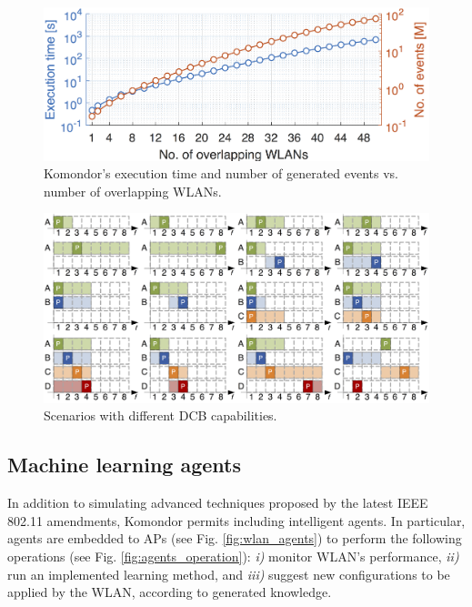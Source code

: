 \documentclass[conference]{IEEEtran}
\begin{document}
	\begin{figure}[t]
		\centering	
		\includegraphics[width=1\columnwidth]{results_scenario_3_perf.png}
		\caption{Komondor's execution time and number of generated events vs. number of overlapping WLANs.}
		\label{fig:results_high_density_scenarios_time}
	\end{figure}
	
	\begin{figure}[h]
		\centering	
		\includegraphics[width=0.95\columnwidth]{channel_allocation.png}
		\caption{Scenarios with different DCB capabilities.} %
		\label{fig:channel_allocation}
	\end{figure}
	
	\subsection{Machine learning agents}
	\label{section:machine_learning}
	
	In addition to simulating advanced techniques proposed by the latest IEEE 802.11 amendments, Komondor permits including intelligent agents. In particular, agents are embedded to APs (see Fig. \ref{fig:wlan_agents}) to perform the following operations (see Fig. \ref{fig:agents_operation}): \emph{i)} monitor WLAN's performance, \emph{ii)} run an implemented learning method, and \emph{iii)} suggest new configurations to be applied by the WLAN, according to generated knowledge.
	
\end{document}
